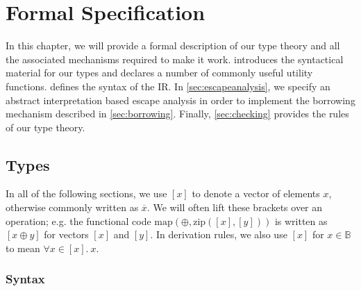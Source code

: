 \chapter{Formal Specification}\label{sec:theory}

In this chapter, we will provide a formal description of our type theory and all the associated mechanisms required to make it work.  introduces the syntactical material for our types and declares a number of commonly useful utility functions.  defines the syntax of the IR. In \cref{sec:escapeanalysis}, we specify an abstract interpretation based escape analysis in order to implement the borrowing mechanism described in \cref{sec:borrowing}. Finally, \cref{sec:checking} provides the rules of our type theory.

\newcommand{\sep}{\ \ |\ \ }
\newcommand{\icode}[1]{\textrm{\lstinline[language=ir-if]|#1|}}

\section{Types}\label{sec:types}
In all of the following sections, we use $[x]$ to denote a vector of elements $x$, otherwise commonly written as $\overline{x}$. We will often lift these brackets over an operation; e.g. the functional code $\mathrm{map}(\oplus, \mathrm{zip}([x], [y]))$ is written as $[x \oplus y]$ for vectors $[x]$ and $[y]$. In derivation rules, we also use $[x]$ for $x \in \mathbb{B}$ to mean $\forall x \in [x].\ x$.

\subsection{Syntax}

\newcommand{\dom}{\mathrm{dom}}
\newcommand{\Var}{\mathrm{Var}}
\newcommand{\Ctor}{\mathrm{Ctor}}
\newcommand{\Proj}{\mathrm{Proj}}
\newcommand{\Const}{\mathrm{Const}}
\newcommand{\Attr}{\mathrm{Attr}}
\newcommand{\ADT}{\mathrm{ADT}}
\newcommand{\adt}{\mathrm{adt}}
\newcommand{\field}{\mathrm{field}}
\newcommand{\ADTConst}{\mathrm{ADTConst}}
\newcommand{\AttrType}{\mathrm{AttrType}}
\newcommand{\arrg}{\mathrm{arg}}
\newcommand{\param}{\mathrm{param}}
\newcommand{\ret}{\mathrm{ret}}
\newcommand{\ADTDecls}{\mathrm{ADTDecls}}
\newcommand{\FunTypes}{\mathrm{FunTypes}}

